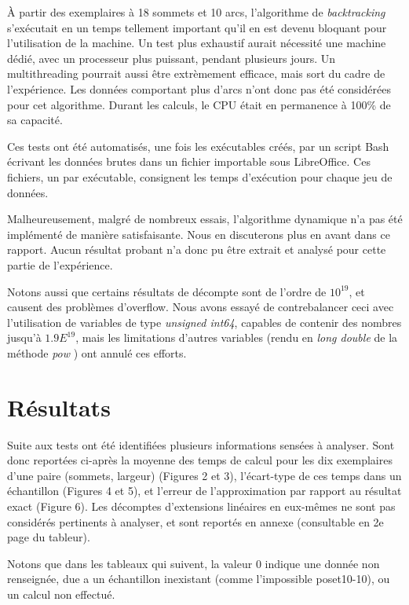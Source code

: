 \documentclass[10pt,a4paper]{article}
\begin{document}
À partir des exemplaires à 18 sommets et 10 arcs, l'algorithme de \textit{backtracking} s'exécutait en un temps tellement important qu'il en est devenu bloquant pour l'utilisation de la machine. Un test plus exhaustif aurait nécessité une machine dédié, avec un processeur plus puissant, pendant plusieurs jours. Un multithreading pourrait aussi être extrèmement efficace, mais sort du cadre de l'expérience. Les données comportant plus d'arcs n'ont donc pas été considérées pour cet algorithme. Durant les calculs, le CPU était en permanence à 100\% de sa capacité.

Ces tests ont été automatisés, une fois les exécutables créés, par un script Bash écrivant les données brutes dans un fichier importable sous LibreOffice. Ces fichiers, un par exécutable, consignent les temps d'exécution pour chaque jeu de données.

Malheureusement, malgré de nombreux essais, l'algorithme dynamique n'a pas été implémenté de manière satisfaisante. Nous en discuterons plus en avant dans ce rapport. Aucun résultat probant n'a donc pu être extrait et analysé pour cette partie de l'expérience.

Notons aussi que certains résultats de décompte sont de l'ordre de $ 10^{19} $, et causent des problèmes d'overflow. Nous avons essayé de contrebalancer ceci avec l'utilisation de variables de type \textit{unsigned int64}, capables de contenir des nombres jusqu'à ${1.9E^{19}}$, mais les limitations d'autres variables (rendu en \textit{long double} de la méthode \textit{pow} ) ont annulé ces efforts.

\newpage

\section{Résultats}

Suite aux tests ont été identifiées plusieurs informations sensées à analyser. Sont donc reportées ci-après la moyenne des temps de calcul pour les dix exemplaires d'une paire (sommets, largeur) (Figures 2 et 3), l'écart-type de ces temps dans un échantillon (Figures 4 et 5), et l'erreur de l'approximation par rapport au résultat exact (Figure 6). Les décomptes d'extensions linéaires en eux-mêmes ne sont pas considérés pertinents à analyser, et sont reportés en annexe (consultable en 2e page du tableur).

Notons que dans les tableaux qui suivent, la valeur $0$ indique une donnée non renseignée, due a un échantillon inexistant (comme l'impossible poset10-10), ou un calcul non effectué.
\end{document}
